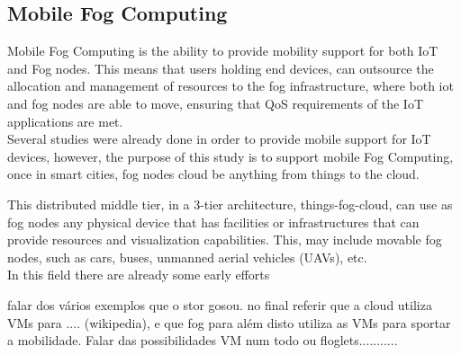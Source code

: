 \subsection{Mobile Fog Computing}
\label{sec:Mobility}
Mobile Fog Computing is the ability to provide mobility support for both IoT and
Fog nodes. This means that users holding end devices, can outsource the
allocation and management of resources to the fog infrastructure, where both iot
and fog nodes are able to move, ensuring that QoS requirements of the IoT
applications are met.\\
Several studies were already done in order to provide mobile support for IoT
devices, however, the purpose of this study is to support mobile Fog Computing,
once in smart cities, fog nodes cloud be anything from things to the cloud.

This distributed middle tier, in a 3-tier architecture, things-fog-cloud, can
use as fog nodes any physical device that has facilities or infrastructures that
can provide resources and visualization capabilities.  This, may include movable
fog nodes, such as cars, buses, unmanned aerial vehicles (UAVs), etc.\\
In this field there are already some early efforts

falar dos vários exemplos que o stor gosou. no final referir que a cloud utiliza VMs para .... (wikipedia), e que fog para além disto utiliza as VMs para sportar a mobilidade. Falar das possibilidades VM num todo ou floglets...........




